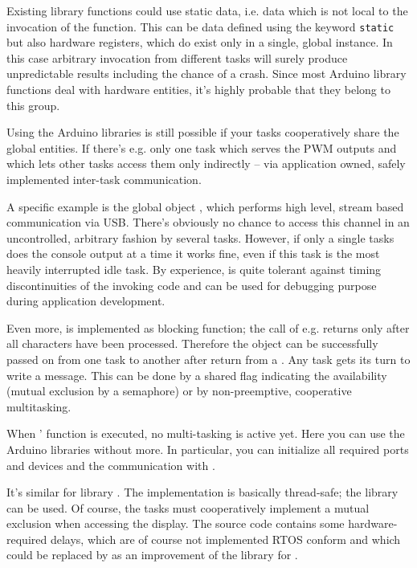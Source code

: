 Existing library functions could use static data, i.e. data which is not
local to the invocation of the function. This can be data defined using
the keyword \verb+static+ but also hardware registers, which do exist only
in a single, global instance. In this case arbitrary invocation from
different tasks will surely produce unpredictable results including the
chance of a crash. Since most Arduino library functions deal with hardware
entities, it's highly probable that they belong to this group.

Using the Arduino libraries is still possible if your tasks cooperatively
share the global entities. If there's e.g. only one task which serves the
PWM outputs and which lets other tasks access them only indirectly -- via
application owned, safely implemented inter-task communication.

A specific example is the global object , which performs
high level, stream based communication via USB. There's obviously no
chance to access this channel in an uncontrolled, arbitrary fashion by
several tasks. However, if only a single tasks does the console output at
a time it works fine, even if this task is the most heavily interrupted
idle task. By experience,  is quite tolerant against timing
discontinuities of the invoking code and can be used for debugging purpose
during application development.

Even more,  is implemented as blocking function; the call of
e.g.  returns only after all characters have been processed.
Therefore the object can be successfully passed on from one task to another
after return from a . Any task gets its turn to write a
message. This can be done by a shared flag indicating the availability
(mutual exclusion by a semaphore) or by non-preemptive, cooperative
multitasking.

When \rtos{}' function  is executed, no multi-tasking is
active yet. Here you can use the Arduino libraries without more. In
particular, you can initialize all required ports and devices and the
communication with .

It's similar for library . The implementation is
basically thread-safe; the library can be used. Of course, the tasks must
cooperatively implement a mutual exclusion when accessing the display. The
source code contains some hardware-required delays, which are of
course not implemented RTOS conform and which could be replaced by
 as an improvement of the library for \rtos. 

